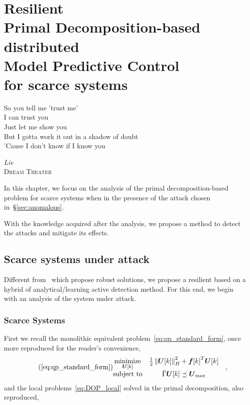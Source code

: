 \documentclass[../main.tex]{subfiles}
\begin{document}
\chapter[Resilient Primal Decomposition-based dMPC for scarce systems]{Resilient \\Primal Decomposition-based \\distributed \\Model Predictive Control\\ for scarce systems}\label{sec:safe_pddmpc_eq}
\epigraph{\centering So you tell me 'trust me' \\I can trust you\\ Just let me show you \\But I gotta work it out in a shadow of doubt \\'Cause I don't know if I know you}
{\textit{Lie}\\\textsc{Dream Theater}}

In this chapter, we focus on the analysis of the primal decomposition-based \dmpc{} problem for scarce systems when in the presence of the attack chosen in~\S\ref{sec:anomalous}.

With the knowledge acquired after the analysis, we propose a method to detect the attacks and mitigate its effects.

\minitoc


\section{Scarce systems under attack}\label{sec:analys-scarce-syst}

Different from~\cite{VelardeEtAl2018,MaestreEtAl2021} which propose robust solutions, we propose a resilient \dmpc{} based on a hybrid of analytical/learning active detection method.
For this end, we begin with an analysis of the system under attack.

\subsection{Scarce Systems}\label{sec:scarce-systems}
First we recall the monolithic \mpc{} equivalent problem~\eqref{eq:qp_standard_form}, once more reproduced for the reader's convenience,
\begin{equation}
  \label{eq:qp_standard_form_again}
  \tag{\ref*{eq:qp_standard_form}}
  \begin{aligned}
    \begin{matrix}
      \minimize\limits_{\vec{U}[k]} &
                                                 \frac{1}{2}\norm{\vec{U}[k]}^{2}_{H} + {\vec{f}[k]}^{T}\vec{U}[k] &\\
      \mathrm{subject~ to} &
                             \bar{\Gamma}\vec{U}[k]\preceq {\vec{U}}_{\text{max}}
    \end{matrix}
  \end{aligned},
\end{equation}
and the local problems~\eqref{eq:DOP_local} solved in the primal decomposition, also reproduced,
\end{document}
